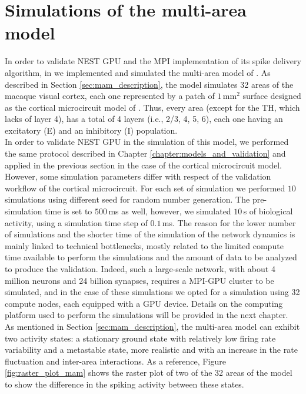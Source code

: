 \documentclass[a4paper, 12pt, twoside, openright]{book}
\begin{document}
\section{Simulations of the multi-area model}
In order to validate NEST GPU and the MPI implementation of its spike delivery algorithm, in \cite{Tiddia2022} we implemented and simulated the multi-area model of \cite{Schuecker2017, Schmidt2018b, Schmidt2018}. As described in Section \ref{sec:mam_description}, the model simulates 32 areas of the macaque visual cortex, each one represented by a patch of $1$\,mm$^2$ surface designed as the cortical microcircuit model of \cite{Potjans2012}. Thus, every area (except for the TH, which lacks of layer 4), has a total of 4 layers (i.e., 2/3, 4, 5, 6), each one having an excitatory (E) and an inhibitory (I) population.\\
In order to validate NEST GPU in the simulation of this model, we performed the same protocol described in Chapter \ref{chapter:models_and_validation} and applied in the previous section in the case of the cortical microcircuit model. However, some simulation parameters differ with respect of the validation workflow of the cortical microcircuit. For each set of simulation we performed $10$ simulations using different seed for random number generation. The pre-simulation time is set to $500$\,ms as well, however, we simulated $10$\,s of biological activity, using a simulation time step of $0.1$\,ms. The reason for the lower number of simulations and the shorter time of the simulation of the network dynamics is mainly linked to technical bottlenecks, mostly related to the limited compute time available to perform the simulations and the amount of data to be analyzed to produce the validation. Indeed, such a large-scale network, with about 4 million neurons and 24 billion synapses, requires a MPI-GPU cluster to be simulated, and in the case of these simulations we opted for a simulation using 32 compute nodes, each equipped with a GPU device. Details on the computing platform used to perform the simulations will be provided in the next chapter.\\
As mentioned in Section \ref{sec:mam_description}, the multi-area model can exhibit two activity states: a stationary ground state with relatively low firing rate variability and a metastable state, more realistic and with an increase in the rate fluctuation and inter-area interactions. As a reference, Figure \ref{fig:raster_plot_mam} shows the raster plot of two of the 32 areas of the model to show the difference in the spiking activity between these states.
\end{document}
